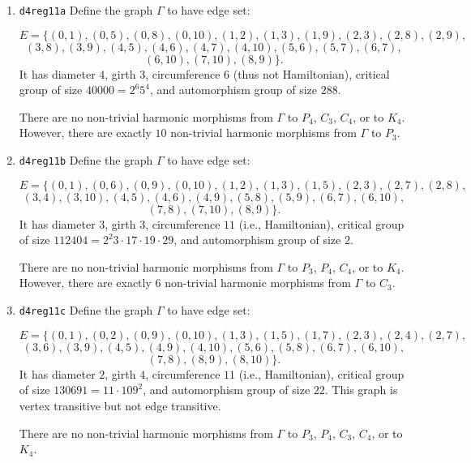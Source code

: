 \documentclass[12pt,letterpaper]{article}
\theoremstyle{definition}
\begin{document}
\begin{enumerate}
\item
 {\tt d4reg11a}\newline
  Define the graph  $\Gamma$
  to have edge set:

\[
E = \{
(0, 1), (0, 5), (0, 8), (0, 10), (1, 2), (1, 3), (1, 9), (2, 3), (2, 8), (2, 9),
\]
\[
(3, 8), (3, 9), (4, 5), (4, 6), (4, 7), (4, 10), (5, 6), (5, 7), (6, 7),
\]
\[
(6, 10), (7, 10), (8, 9)
\}.
\]
It has diameter $4$,
girth $3$, circumference $6$ (thus not Hamiltonian),
critical group of size $40000 = 2^6 5^4$, 
and automorphism group of size $288$. 

There are no non-trivial harmonic morphisms from $\Gamma$ to $P_4$, $C_3$, $C_4$, or to $K_4$. 
However, there are exactly $10$ non-trivial harmonic morphisms from $\Gamma$ to $P_3$. 

\item
 {\tt d4reg11b}\newline
  Define the graph  $\Gamma$
  to have edge set:

\[
E = \{
(0, 1), (0, 6), (0, 9), (0, 10), (1, 2), (1, 3), (1, 5), (2, 3), (2, 7), (2, 8),
\]
\[
(3, 4), (3, 10), (4, 5), (4, 6), (4, 9), (5, 8), (5, 9), (6, 7), (6, 10),
\]
\[
(7, 8), (7, 10), (8, 9)
\}.
\]
It has diameter $3$,
girth $3$, circumference $11$ (i.e., Hamiltonian),
critical group of size $112404 = 2^2 3 \cdot 17 \cdot 19\cdot 29$, 
and automorphism group of size $2$. 

There are no non-trivial harmonic morphisms from $\Gamma$ to $P_3$, $P_4$, $C_4$, or to $K_4$.
However, there are exactly $6$ non-trivial harmonic morphisms from $\Gamma$ to $C_3$. 


\item
 {\tt d4reg11c}\newline
  Define the graph  $\Gamma$
  to have edge set:

\[
E = \{
(0, 1), (0, 2), (0, 9), (0, 10), (1, 3), (1, 5), (1, 7), (2, 3), (2, 4), (2, 7),
\]
\[
(3, 6), (3, 9), (4, 5), (4, 9), (4, 10), (5, 6), (5, 8), (6, 7), (6, 10),
\]
\[
(7, 8), (8, 9), (8, 10)
\}.
\]
It has diameter $2$,
girth $4$, circumference $11$ (i.e., Hamiltonian),
critical group of size $130691 = 11\cdot 109^2$, 
and automorphism group of size $22$. This graph is vertex transitive but not
edge transitive.

There are no non-trivial harmonic morphisms from $\Gamma$ to $P_3$, $P_4$, $C_3$, $C_4$, or to $K_4$.



\end{enumerate}
\end{document}
